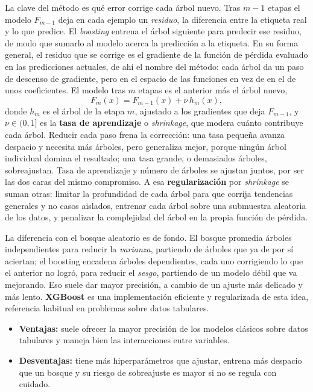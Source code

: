 \documentclass[12pt,a4paper]{report}
\theoremstyle{definition}
\begin{document}
La clave del método es qué error corrige cada árbol nuevo. Tras $m-1$ etapas el modelo $F_{m-1}$ deja
en cada ejemplo un \emph{residuo}, la diferencia entre la etiqueta real y lo que predice. El \emph{boosting}
entrena el árbol siguiente para predecir ese residuo, de modo que sumarlo al modelo acerca la
predicción a la etiqueta. En su forma general, el residuo que se corrige es el gradiente de la función
de pérdida evaluado en las predicciones actuales, de ahí el nombre del método: cada árbol da un paso de
descenso de gradiente, pero en el espacio de las funciones en vez de en el de unos coeficientes. El
modelo tras $m$ etapas es el anterior más el árbol nuevo,
\begin{equation}
F_m(x) = F_{m-1}(x) + \nu\, h_m(x),
\label{eq:boosting}
\end{equation}
donde $h_m$ es el árbol de la etapa $m$, ajustado a los gradientes que deja $F_{m-1}$, y $\nu\in(0,1]$
es la \textbf{tasa de aprendizaje} o \emph{shrinkage}, que modera cuánto contribuye cada árbol.
Reducir cada paso frena la corrección: una tasa pequeña avanza despacio y necesita más árboles, pero
generaliza mejor, porque ningún árbol individual domina el resultado; una tasa grande, o demasiados
árboles, sobreajustan. Tasa de aprendizaje y número de árboles se ajustan juntos, por ser las dos caras
del mismo compromiso. A esa \textbf{regularización} por \emph{shrinkage} se suman otras: limitar la
profundidad de cada árbol para que corrija tendencias generales y no casos aislados, entrenar cada árbol
sobre una submuestra aleatoria de los datos, y penalizar la complejidad del árbol en la propia función
de pérdida.

La diferencia con el bosque aleatorio es de fondo. El bosque promedia árboles independientes para
reducir la \emph{varianza}, partiendo de árboles que ya de por sí aciertan; el boosting encadena
árboles dependientes, cada uno corrigiendo lo que el anterior no logró, para reducir el \emph{sesgo},
partiendo de un modelo débil que va mejorando. Eso suele dar mayor precisión, a cambio de un ajuste más
delicado y más lento. \textbf{XGBoost} \cite{chen2016xgboost} es una implementación eficiente y
regularizada de esta idea, referencia habitual en problemas sobre datos tabulares.

\begin{itemize}
\item \textbf{Ventajas:} suele ofrecer la mayor precisión de los modelos clásicos sobre datos
tabulares y maneja bien las interacciones entre variables.
\item \textbf{Desventajas:} tiene más hiperparámetros que ajustar, entrena más despacio que un bosque y
su riesgo de sobreajuste es mayor si no se regula con cuidado.
\end{itemize}
\end{document}
